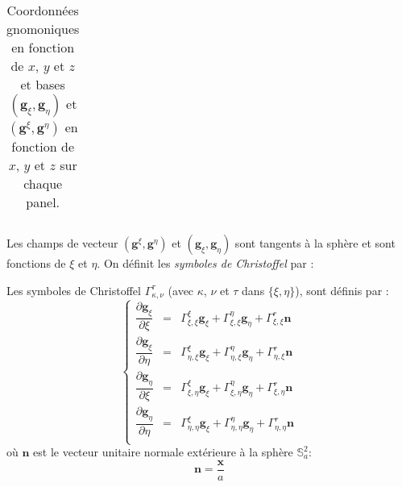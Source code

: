 \begin{table}[htbp]
\begin{center}
\begin{tabular}{|c|c|c|}
\end{tabular}
\end{center}
\caption{Coordonnées gnomoniques en fonction de $x$, $y$ et $z$ et bases $\left( \mathbf{g}_{\xi}, \mathbf{g}_{\eta} \right)$ et $\left( \mathbf{g}^{\xi}, \mathbf{g}^{\eta} \right)$ en fonction de $x$, $y$ et $z$  sur chaque panel.}
\label{tab: base g_xi g_eta}
\end{table}

Les champs de vecteur $( \mathbf{g}^{\xi}, \mathbf{g}^{\eta})$ et $( \mathbf{g}_ {\xi}, \mathbf{g}_{\eta})$ sont tangents à la sphère et sont fonctions de $\xi$ et $\eta$. On définit les \textit{symboles de Christoffel} par :

\begin{definition}
Les symboles de Christoffel $\Gamma_{\kappa,\nu}^{\tau}$ (avec $\kappa$, $\nu$ et $\tau$ dans $\lbrace \xi, \eta \rbrace$), sont définis par :
\begin{equation}
\left\lbrace
\begin{array}{rcl}
\dfrac{\partial \mathbf{g}_{\xi}}{\partial \xi} & = & \Gamma_{\xi,\xi}^{\xi} \mathbf{g}_{\xi} + \Gamma_{\xi,\xi}^{\eta} \mathbf{g}_{\eta}+ \Gamma_{\xi, \xi}^{r} \mathbf{n}\\

\dfrac{\partial \mathbf{g}_{\xi}}{\partial \eta} & = & \Gamma_{\eta,\xi}^{\xi} \mathbf{g}_{\xi} + \Gamma_{\eta,\xi}^{\eta} \mathbf{g}_{\eta}+ \Gamma_{\eta, \xi}^{r} \mathbf{n}\\

\dfrac{\partial \mathbf{g}_{\eta}}{\partial \xi} & = & \Gamma_{\xi,\eta}^{\xi} \mathbf{g}_{\xi} + \Gamma_{\xi,\eta}^{\eta} \mathbf{g}_{\eta}+ \Gamma_{\xi, \eta}^{r} \mathbf{n}\\

\dfrac{\partial \mathbf{g}_{\eta}}{\partial \eta} & = & \Gamma_{\eta,\eta}^{\xi} \mathbf{g}_{\xi} + \Gamma_{\eta,\eta}^{\eta} \mathbf{g}_{\eta}+ \Gamma_{\eta, \eta}^{r} \mathbf{n}\\
\end{array}
\right.
\end{equation}
où $\mathbf{n}$ est le vecteur unitaire normale extérieure à la sphère $\mathbb{S}_a^2$:
\begin{equation}
\mathbf{n}= \dfrac{\mathbf{x}}{a}
\end{equation}
\end{definition}

